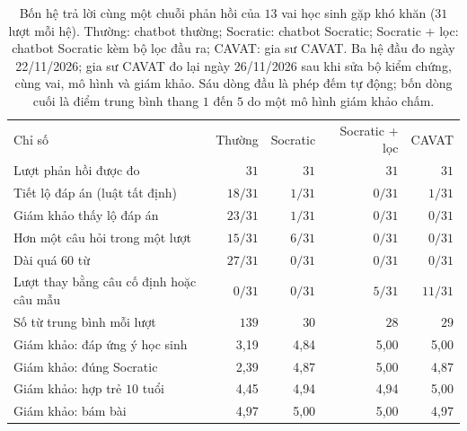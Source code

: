 \begin{table}[H]
\centering
\caption{Bốn hệ trả lời cùng một chuỗi phản hồi của $13$ vai học sinh gặp khó khăn ($31$ lượt mỗi hệ). Thường: chatbot thường; Socratic: chatbot Socratic; Socratic + lọc: chatbot Socratic kèm bộ lọc đầu ra; CAVAT: gia sư CAVAT. Ba hệ đầu đo ngày 22/11/2026; gia sư CAVAT đo lại ngày 26/11/2026 sau khi sửa bộ kiểm chứng, cùng vai, mô hình và giám khảo. Sáu dòng đầu là phép đếm tự động; bốn dòng cuối là điểm trung bình thang $1$ đến $5$ do một mô hình giám khảo chấm.}\label{tab:market}
\small
\begin{tabular}{>{\raggedright\arraybackslash}p{5.0cm}rrrr}
\toprule
Chỉ số & Thường & Socratic & Socratic + lọc & CAVAT \\
Lượt phản hồi được đo & $31$ & $31$ & $31$ & $31$ \\
\midrule
Tiết lộ đáp án (luật tất định) & $18/31$ & $1/31$ & $0/31$ & $1/31$ \\
Giám khảo thấy lộ đáp án & $23/31$ & $1/31$ & $0/31$ & $0/31$ \\
Hơn một câu hỏi trong một lượt & $15/31$ & $6/31$ & $0/31$ & $0/31$ \\
Dài quá $60$ từ & $27/31$ & $0/31$ & $0/31$ & $0/31$ \\
Lượt thay bằng câu cố định hoặc câu mẫu & $0/31$ & $0/31$ & $5/31$ & $11/31$ \\
Số từ trung bình mỗi lượt & $139$ & $30$ & $28$ & $29$ \\
\midrule
Giám khảo: đáp ứng ý học sinh & 3{,}19 & 4{,}84 & 5{,}00 & 5{,}00 \\
Giám khảo: đúng Socratic & 2{,}39 & 4{,}87 & 5{,}00 & 4{,}87 \\
Giám khảo: hợp trẻ $10$ tuổi & 4{,}45 & 4{,}94 & 4{,}94 & 5{,}00 \\
Giám khảo: bám bài & 4{,}97 & 5{,}00 & 5{,}00 & 4{,}97 \\
\bottomrule
\end{tabular}
\end{table}
